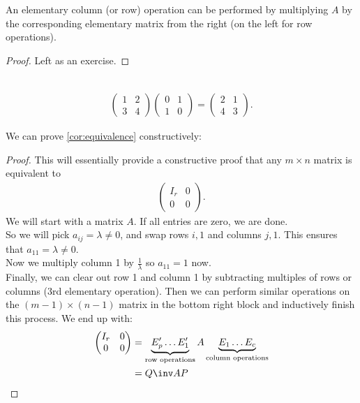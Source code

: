 An elementary column (or row) operation can be performed by multiplying $A$ by the corresponding elementary matrix from the right (on the left for row operations).
\begin{proof}
    Left as an exercise.
\end{proof} 

\begin{example} ~\vspace*{-1.5\baselineskip}
    \begin{align*}
        \begin{pmatrix}1 & 2 \\3 & 4\end{pmatrix} \begin{pmatrix}0 & 1 \\1 & 0\end{pmatrix} = \begin{pmatrix}2 & 1 \\4 & 3\end{pmatrix}.
    \end{align*} 
\end{example} 

We can prove \cref{cor:equivalence} constructively:
\begin{proof}
    This will essentially provide a constructive proof that any $m \times n$ matrix is equivalent to
    \begin{align*}
        \begin{pmatrix} I_r & 0 \\ 0 & 0 \end{pmatrix}.
    \end{align*}
    We will start with a matrix $A$.
    If all entries are zero, we are done. \\
    So we will pick $a_{ij} = \lambda \neq 0$, and swap rows $i,1$ and columns $j,1$.
    This ensures that $a_{11} = \lambda \neq 0$. \\
    Now we multiply column 1 by $\frac{1}{\lambda}$ so $a_{11} = 1$ now. \\
    Finally, we can clear out row 1 and column 1 by subtracting multiples of rows or columns (3rd elementary operation).
    Then we can perform similar operations on the $(m-1)\times(n-1)$ matrix in the bottom right block and inductively finish this process.
    We end up with:
    \begin{align*}
        \begin{pmatrix} I_r & 0 \\ 0 & 0 \end{pmatrix} &= \underbrace{E_p' \dots E_1'}_\text{row operations} A \underbrace{E_1 \dots E_c}_{\text{column operations}} \\
        &= Q\inv A P
    \end{align*} 
\end{proof} 

